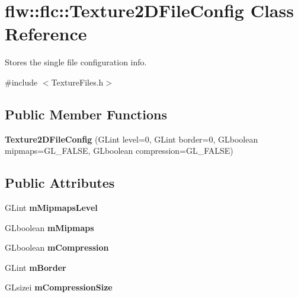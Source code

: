 \hypertarget{classflw_1_1flc_1_1Texture2DFileConfig}{}\section{flw\+:\+:flc\+:\+:Texture2\+D\+File\+Config Class Reference}
\label{classflw_1_1flc_1_1Texture2DFileConfig}


Stores the single file configuration info.  




{\ttfamily \#include $<$Texture\+Files.\+h$>$}

\subsection*{Public Member Functions}
\begin{DoxyCompactItemize}
\item 
{\bfseries Texture2\+D\+File\+Config} (G\+Lint level=0, G\+Lint border=0, G\+Lboolean mipmaps=G\+L\+\_\+\+F\+A\+L\+SE, G\+Lboolean compression=G\+L\+\_\+\+F\+A\+L\+SE)\hypertarget{classflw_1_1flc_1_1Texture2DFileConfig_a9460ffd6c886e47eb9a4cf208f80f347}{}\label{classflw_1_1flc_1_1Texture2DFileConfig_a9460ffd6c886e47eb9a4cf208f80f347}

\end{DoxyCompactItemize}
\subsection*{Public Attributes}
\begin{DoxyCompactItemize}
\item 
G\+Lint {\bfseries m\+Mipmaps\+Level}\hypertarget{classflw_1_1flc_1_1Texture2DFileConfig_a6c1e5d6eca403cec9a761cc726660e37}{}\label{classflw_1_1flc_1_1Texture2DFileConfig_a6c1e5d6eca403cec9a761cc726660e37}

\item 
G\+Lboolean {\bfseries m\+Mipmaps}\hypertarget{classflw_1_1flc_1_1Texture2DFileConfig_a52f1cfb2f1c0ebe03cb58a169e77b2da}{}\label{classflw_1_1flc_1_1Texture2DFileConfig_a52f1cfb2f1c0ebe03cb58a169e77b2da}

\item 
G\+Lboolean {\bfseries m\+Compression}\hypertarget{classflw_1_1flc_1_1Texture2DFileConfig_a8d344c9e3b39c34d6e972ea707d4fc7c}{}\label{classflw_1_1flc_1_1Texture2DFileConfig_a8d344c9e3b39c34d6e972ea707d4fc7c}

\item 
G\+Lint {\bfseries m\+Border}\hypertarget{classflw_1_1flc_1_1Texture2DFileConfig_aed975fce43ed5c8b7c5ef427478fb20d}{}\label{classflw_1_1flc_1_1Texture2DFileConfig_aed975fce43ed5c8b7c5ef427478fb20d}

\item 
G\+Lsizei {\bfseries m\+Compression\+Size}\hypertarget{classflw_1_1flc_1_1Texture2DFileConfig_aea9d6ddc99455e9de6d60b4f55af6ce5}{}\label{classflw_1_1flc_1_1Texture2DFileConfig_aea9d6ddc99455e9de6d60b4f55af6ce5}

\end{DoxyCompactItemize}


